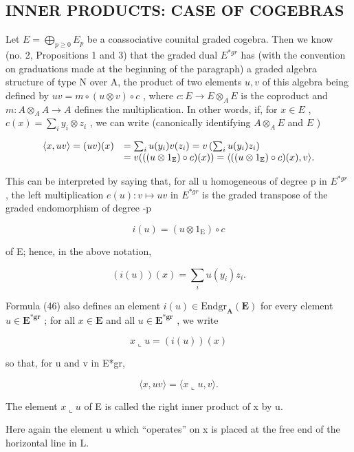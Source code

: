 \subsection{INNER PRODUCTS: CASE OF COGEBRAS}

Let \(E = \bigoplus_{p \geq 0} E_p\) be a coassociative counital graded cogebra. Then we know (no. 2, Propositions 1 and 3) that the graded dual \(E^{*gr}\) has (with the convention on graduations made at the beginning of the paragraph) a graded algebra structure of type N over A, the product of two elements \(u, v\) of this algebra being defined by \(uv = m \circ (u \otimes v) \circ c\) , where \(c: E \to E \otimes_A E\) is the coproduct and \(m: A \otimes_A A \to A\) defines the multiplication. In other words, if, for \(x \in E\) , \(c(x) = \sum_i y_i \otimes z_i\) , we can write (canonically identifying \(A \otimes_A E\) and \(E\) )

\[
\begin{array}{r l} \langle x, u v \rangle = (u v) (x) & = \sum_ {i} u (y _ {i}) v (z _ {i}) = v \left(\sum_ {i} u (y _ {i}) z _ {i}\right) \\ & = v (((u \otimes 1 _ {\mathbb {E}}) \circ c) (x)) = \langle ((u \otimes 1 _ {\mathbb {E}}) \circ c) (x), v \rangle . \end{array}
\]

This can be interpreted by saying that, for all u homogeneous of degree p in \(E^{*gr}\) , the left multiplication \(e(u): v \mapsto uv\) in \(E^{*gr}\) is the graded transpose of the graded endomorphism of degree -p

\[
i (u) = (u \otimes 1 _ {\mathrm{E}}) \circ c\tag{46}
\]

of E; hence, in the above notation,

\[
(i (u)) (x) = \sum_ {i} u (y _ {i}) z _ {i}.
\]

Formula (46) also defines an element \(i(u)\in\mathrm{Endgr}_{\mathbf{A}}(\mathbf{E})\) for every element \(u\in\mathbf{E}^{*\mathbf{g}\mathbf{r}}\) ; for all \(x\in\mathbf{E}\) and all \(u\in\mathbf{E}^{*\mathbf{g}\mathbf{r}}\) , we write

\[
x \llcorner u = (i (u)) (x)\tag{47}
\]

so that, for u and v in E*gr,

\[
\langle x, u v \rangle = \langle x \llcorner u, v \rangle .
\]

The element \(x \llcorner u\) of E is called the right inner product of x by u.

Here again the element u which ``operates'' on x is placed at the free end of the horizontal line in L.

